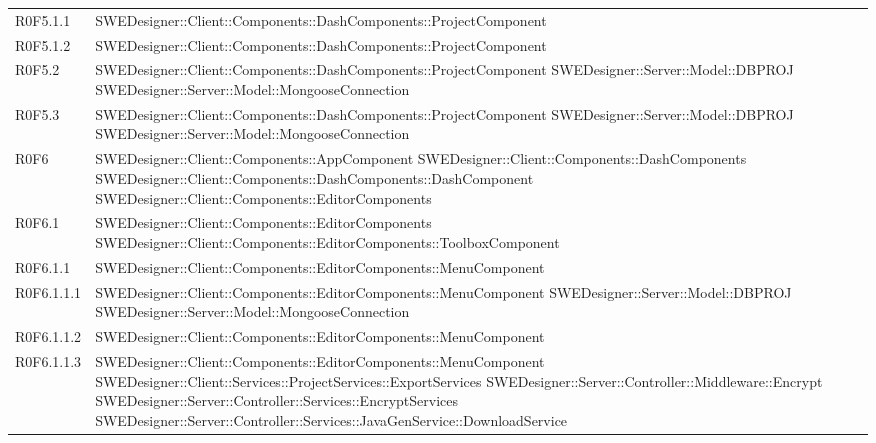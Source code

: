 \begin{center}
\begin{longtable}{p{2cm}!{\VRule[1pt]}p{14cm}}
R0F5.1.1 & SWEDesigner::Client::Components::DashComponents::ProjectComponent \\
R0F5.1.2 & SWEDesigner::Client::Components::DashComponents::ProjectComponent \\
R0F5.2 & SWEDesigner::Client::Components::DashComponents::ProjectComponent \newline SWEDesigner::Server::Model::DBPROJ \newline SWEDesigner::Server::Model::MongooseConnection \\
R0F5.3 & SWEDesigner::Client::Components::DashComponents::ProjectComponent \newline SWEDesigner::Server::Model::DBPROJ \newline SWEDesigner::Server::Model::MongooseConnection \\
R0F6 & SWEDesigner::Client::Components::AppComponent \newline SWEDesigner::Client::Components::DashComponents \newline SWEDesigner::Client::Components::DashComponents::DashComponent \newline SWEDesigner::Client::Components::EditorComponents \\
R0F6.1 & SWEDesigner::Client::Components::EditorComponents \newline SWEDesigner::Client::Components::EditorComponents::ToolboxComponent \\
R0F6.1.1 & SWEDesigner::Client::Components::EditorComponents::MenuComponent \\
R0F6.1.1.1 & SWEDesigner::Client::Components::EditorComponents::MenuComponent \newline SWEDesigner::Server::Model::DBPROJ \newline SWEDesigner::Server::Model::MongooseConnection \\
R0F6.1.1.2 & SWEDesigner::Client::Components::EditorComponents::MenuComponent \\
R0F6.1.1.3 & SWEDesigner::Client::Components::EditorComponents::MenuComponent \newline SWEDesigner::Client::Services::ProjectServices::ExportServices \newline SWEDesigner::Server::Controller::Middleware::Encrypt \newline SWEDesigner::Server::Controller::Services::EncryptServices \newline SWEDesigner::Server::Controller::Services::JavaGenService::DownloadService \\

\end{longtable}
\end{center}

